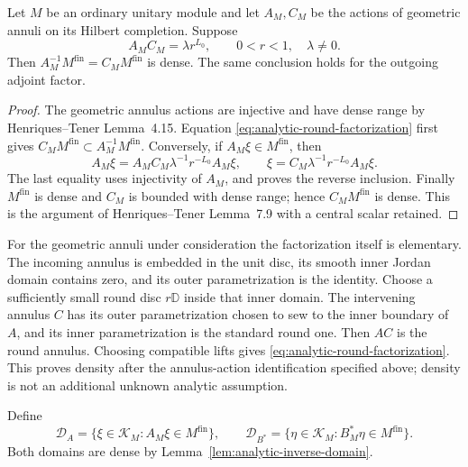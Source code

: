 \begin{lemma}
\label{lem:analytic-inverse-domain}
Let $M$ be an ordinary unitary module and let $A_M,C_M$ be the actions
of geometric annuli on its Hilbert completion.  Suppose
\begin{equation}
 A_MC_M=\lambda r^{L_0},\qquad 0<r<1,\quad\lambda\ne0.
 \label{eq:analytic-round-factorization}
\end{equation}
Then $A_M^{-1}M^{\mathrm{fin}}=C_M M^{\mathrm{fin}}$ is dense.
The same conclusion holds for the outgoing adjoint factor.
\end{lemma}
\begin{proof}
The geometric annulus actions are injective and have dense range by
Henriques--Tener Lemma~4.15.  Equation
\eqref{eq:analytic-round-factorization} first gives
$C_M M^{\mathrm{fin}}\subset A_M^{-1}M^{\mathrm{fin}}$.
Conversely, if $A_M\xi\in M^{\mathrm{fin}}$, then
\[
 A_M\xi
  =A_MC_M\lambda^{-1}r^{-L_0}A_M\xi,
 \qquad
 \xi=C_M\lambda^{-1}r^{-L_0}A_M\xi.
\]
The last equality uses injectivity of $A_M$, and proves the reverse
inclusion.  Finally $M^{\mathrm{fin}}$ is dense and $C_M$ is bounded
with dense range; hence $C_M M^{\mathrm{fin}}$ is dense.  This is the
argument of Henriques--Tener Lemma~7.9 with a central scalar retained.
\end{proof}

For the geometric annuli under consideration the factorization itself
is elementary.  The incoming annulus is embedded in the unit disc,
its smooth inner Jordan domain contains zero, and its outer
parametrization is the identity.  Choose a sufficiently small round
disc $r\mathbb D$ inside that inner domain.  The intervening annulus
$C$ has its outer parametrization chosen to sew to the inner boundary
of $A$, and its inner parametrization is the standard round one.
Then $AC$ is the round annulus.  Choosing compatible lifts gives
\eqref{eq:analytic-round-factorization}.  This proves density after
the annulus-action identification specified above; density is not an
additional unknown analytic assumption.

Define
\begin{equation}
 \mathcal D_A=\{\xi\in\mathcal K_M:A_M\xi\in M^{\mathrm{fin}}\},
 \qquad
 \mathcal D_{B^*}=\{\eta\in\mathcal K_M:B_M^*\eta\in M^{\mathrm{fin}}\}.
\label{eq:analytic-annulus-domains}
\end{equation}
Both domains are dense by Lemma~\ref{lem:analytic-inverse-domain}.

